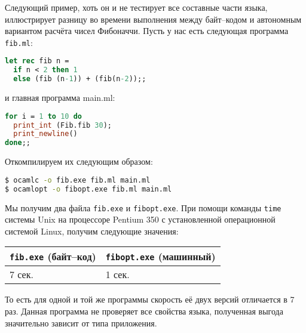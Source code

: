 Следующий пример, хоть он и не тестирует все составные части языка, иллюстрирует
разницу во времени выполнения между байт--кодом и автономным вариантом расчёта
чисел Фибоначчи. Пусть у нас есть следующая программа \texttt{fib.ml}:

\begin{lstlisting}[language=OCaml]
let rec fib n =
  if n < 2 then 1
  else (fib (n-1)) + (fib(n-2));;
\end{lstlisting}

и главная программа main.ml:

\begin{lstlisting}[language=OCaml]
for i = 1 to 10 do
  print_int (Fib.fib 30);
  print_newline()
done;;
\end{lstlisting}

Откомпилируем их следующим образом:

\begin{lstlisting}[language=Bash]
$ ocamlc -o fib.exe fib.ml main.ml
$ ocamlopt -o fibopt.exe fib.ml main.ml
\end{lstlisting}

Мы получим два файла \texttt{fib.exe} и \texttt{fibopt.exe}. При помощи команды
\texttt{time} системы Unix на процессоре Pentium 350 с установленной
операционной системой Linux, получим следующие значения:

\begin{tabular}{|l|l|}
\hline
\texttt{fib.exe} (байт--код) & \texttt{fibopt.exe} (машинный) \\
\hline
7 сек. & 1 сек. \\
\hline
\end{tabular}

То есть для одной и той же программы скорость её двух версий отличается в 7 раз.
Данная программа не проверяет все свойства языка, полученная выгода значительно
зависит от типа приложения.